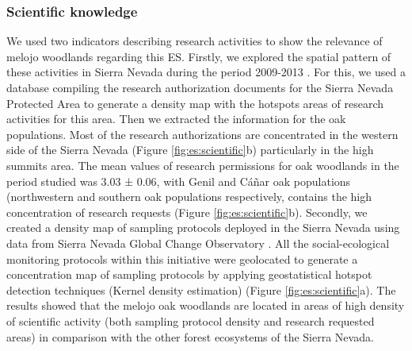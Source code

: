 \subsubsection{Scientific knowledge}\label{sec:es:cultural-scientific} 
We used two indicators describing research activities to show the relevance of melojo woodlands regarding this ES. Firstly, we explored the spatial pattern of these activities in Sierra Nevada during the period 2009-2013 \autocites{Zamoraetal2017MonitoringGlobal}. For this, we used a database compiling the research authorization documents for the Sierra Nevada Protected Area to generate a density map with the hotspots areas of research activities for this area. Then we extracted the information for the oak populations. Most of the research authorizations are concentrated in the western side of the Sierra Nevada (Figure \ref{fig:es:scientific}b) particularly in the high summits area. The mean values of research permissions for \Qp oak woodlands in the period studied was 3.03 ± 0.06, with Genil and Cáñar oak populations (northwestern and southern oak populations respectively, contains the high concentration of research requests (Figure \ref{fig:es:scientific}b). Secondly, we created a density map of sampling protocols deployed in the Sierra Nevada \autocites{Zamoraetal2017MonitoringGlobal} using data from Sierra Nevada Global Change Observatory \autocites{Zamoraetal2016GlobalChange}. All the social-ecological monitoring protocols within this initiative were geolocated to generate a concentration map of sampling protocols by applying geostatistical hotspot detection techniques (Kernel density estimation)\autocites{Zamoraetal2016GlobalChange} (Figure \ref{fig:es:scientific}a). The results showed that the melojo oak woodlands are located in areas of high density of scientific activity (both sampling protocol density and research requested areas) in comparison with the other forest ecosystems of the Sierra Nevada.

